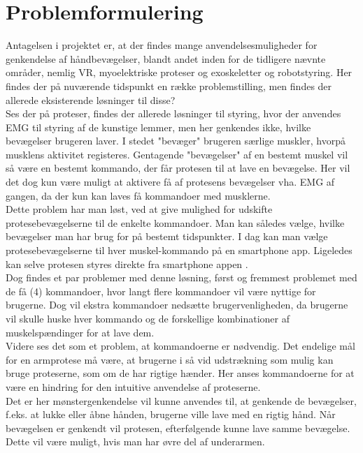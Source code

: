 \thispagestyle{fancy}
\chapter{Problemformulering}
\label{chp:problemformulering}

Antagelsen i projektet er, at der findes mange anvendelsesmuligheder for genkendelse af håndbevægelser, blandt andet inden for de tidligere nævnte områder, nemlig VR, myoelektriske proteser og exoskeletter og robotstyring. Her findes der på nuværende tidspunkt en række problemstilling, men findes der allerede eksisterende løsninger til disse?\\

Ses der på proteser, findes der allerede løsninger til styring, hvor der anvendes EMG til styring af de kunstige lemmer, men her genkendes ikke, hvilke bevægelser brugeren laver. I stedet "bevæger" brugeren særlige muskler, hvorpå musklens aktivitet registeres. Gentagende "bevægelser" af en bestemt muskel vil så være en bestemt kommando, der får protesen til at lave en bevægelse. Her vil det dog kun være muligt at aktivere få af protesens bevægelser vha. EMG af gangen, da der kun kan laves få kommandoer med musklerne. \\

Dette problem har man løst, ved at give mulighed for udskifte protesebevægelserne til de enkelte kommandoer. Man kan således vælge, hvilke bevægelser man har brug for på bestemt tidspunkter. I dag kan man vælge protesebevægelserne til hver muskel-kommando på en smartphone app. Ligeledes kan selve protesen styres direkte fra smartphone appen \cite{touchbionics}.\\
Dog findes et par problemer med denne løsning, først og fremmest problemet med de få (4) kommandoer, hvor langt flere kommandoer vil være nyttige for brugerne. Dog vil ekstra kommandoer nedsætte brugervenligheden, da brugerne vil skulle huske hver kommando og de forskellige kombinationer af muskelspændinger for at lave dem.\\

Videre ses det som et problem, at kommandoerne er nødvendig. Det endelige mål for en armprotese må være, at brugerne i så vid udstrækning som mulig kan bruge proteserne, som om de har rigtige hænder. Her anses kommandoerne for at være en hindring for den intuitive anvendelse af proteserne.\\

Det er her mønstergenkendelse vil kunne anvendes til, at genkende de bevægelser, f.eks. at lukke eller åbne hånden, brugerne ville lave med en rigtig hånd. Når bevægelsen er genkendt vil protesen, efterfølgende kunne lave samme bevægelse. Dette vil være muligt, hvis man har øvre del af underarmen. \\

